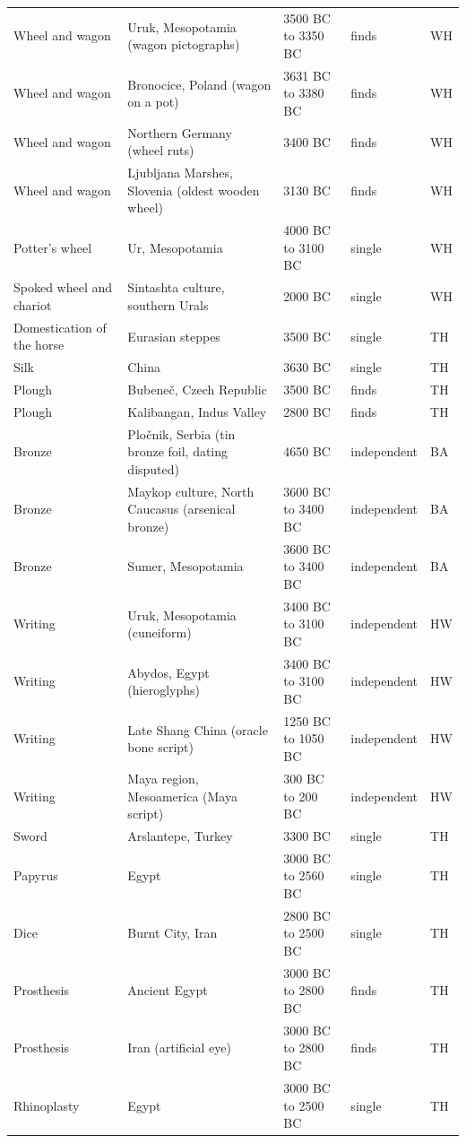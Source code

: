 \documentclass[11pt,a4paper]{article}
\begin{document}
\begin{longtable}{p{3.3cm}p{5.2cm}p{3.3cm}p{1.7cm}l}
Wheel and wagon & Uruk, Mesopotamia (wagon pictographs) & 3500 BC to 3350 BC & finds & WH\\
Wheel and wagon & Bronocice, Poland (wagon on a pot) & 3631 BC to 3380 BC & finds & WH\\
Wheel and wagon & Northern Germany (wheel ruts) & 3400 BC & finds & WH\\
Wheel and wagon & Ljubljana Marshes, Slovenia (oldest wooden wheel) & 3130 BC & finds & WH\\
Potter's wheel & Ur, Mesopotamia & 4000 BC to 3100 BC & single & WH\\
Spoked wheel and chariot & Sintashta culture, southern Urals & 2000 BC & single & WH\\
Domestication of the horse & Eurasian steppes & 3500 BC & single & TH\\
Silk & China & 3630 BC & single & TH\\
Plough & Bubeneč, Czech Republic & 3500 BC & finds & TH\\
Plough & Kalibangan, Indus Valley & 2800 BC & finds & TH\\
Bronze & Pločnik, Serbia (tin bronze foil, dating disputed) & 4650 BC & independent & BA\\
Bronze & Maykop culture, North Caucasus (arsenical bronze) & 3600 BC to 3400 BC & independent & BA\\
Bronze & Sumer, Mesopotamia & 3600 BC to 3400 BC & independent & BA\\
Writing & Uruk, Mesopotamia (cuneiform) & 3400 BC to 3100 BC & independent & HW\\
Writing & Abydos, Egypt (hieroglyphs) & 3400 BC to 3100 BC & independent & HW\\
Writing & Late Shang China (oracle bone script) & 1250 BC to 1050 BC & independent & HW\\
Writing & Maya region, Mesoamerica (Maya script) & 300 BC to 200 BC & independent & HW\\
Sword & Arslantepe, Turkey & 3300 BC & single & TH\\
Papyrus & Egypt & 3000 BC to 2560 BC & single & TH\\
Dice & Burnt City, Iran & 2800 BC to 2500 BC & single & TH\\
Prosthesis & Ancient Egypt & 3000 BC to 2800 BC & finds & TH\\
Prosthesis & Iran (artificial eye) & 3000 BC to 2800 BC & finds & TH\\
Rhinoplasty & Egypt & 3000 BC to 2500 BC & single & TH\\

\end{longtable}
\end{document}

